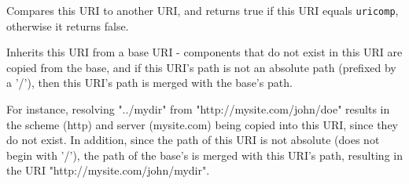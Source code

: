 \label{wxurioperatorcompare}


Compares this URI to another URI, and returns true if 
this URI equals {\tt uricomp}, otherwise it returns false.



\label{wxuriresolve}


Inherits this URI from a base URI - components that do not
exist in this URI are copied from the base, and if this URI's
path is not an absolute path (prefixed by a '/'), then this URI's
path is merged with the base's path.

For instance, resolving "../mydir" from "http://mysite.com/john/doe" 
results in the scheme (http) and server (mysite.com) being copied into 
this URI, since they do not exist.  In addition, since the path
of this URI is not absolute (does not begin with '/'), the path
of the base's is merged with this URI's path, resulting in the URI
"http://mysite.com/john/mydir".


